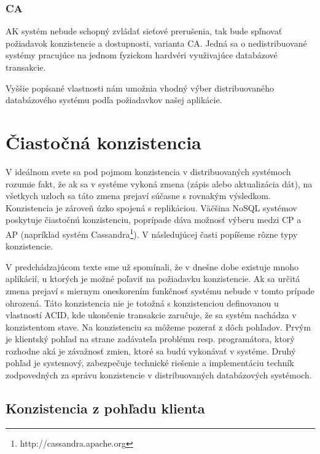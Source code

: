 \documentclass[11pt,twoside,a4paper]{book}
\begin{document}
\subsubsection*{CA}
AK systém nebude schopný zvládať sieťové prerušenia, tak bude spľnovať požiadavok konzistencie a dostupnosti, varianta CA. Jedná sa o nedistribuované systémy pracujúce na jednom fyzickom hardvéri využivajúce databázové transakcie.

Vyššie popísané vlastnosti nám umožnia vhodný výber distribuovaného databázového systému podľa požiadavkov našej aplikácie.

%




\section{Čiastočná konzistencia}
V ideálnom svete sa pod pojmom konzistencia v distribuovaných systémoch rozumie fakt, že ak sa v systéme vykoná zmena (zápis alebo aktualizácia dát), na všetkych uzloch sa táto zmena prejaví súčasne s rovnakým výsledkom. Konzistencia je zároveň úzko spojená s replikáciou. Väčšina NoSQL systémov poskytuje čiastočnú konzistenciu, poprípade dáva možnosť výberu medzi CP a AP (napríklad systém Cassandra\footnote{http://cassandra.apache.org}). V následujúcej časti popíšeme rôzne typy konzistencie.

V predchádzajúcom texte sme už spomínali, že v dnešne dobe existuje mnoho aplikácií, u ktorých je možné poľaviť na požiadavku konzistencie. Ak sa určitá zmena prejaví s miernym oneskorením funkčnosť systému nebude v tomto prípade ohrozená. Táto konzistencia nie je totožná s konzistenciou definovanou u vlastností ACID, kde ukončenie transakcie zaručuje, že sa systém nachádza v konzistentom stave. Na konzistenciu sa môžeme pozerať z dôch pohľadov. Prvým je klientský pohľad na strane zadávateľa problému resp. programátora, ktorý rozhodne aká je závažnosť zmien, ktoré sa budú vykonávať v systéme. Druhý pohľad je systemový, zabezpečuje technické riešenie a implementáciu techník zodpovedných za správu konzistencie v distribuovaných databázových systémoch.


\subsection{Konzistencia z pohľadu klienta}
\end{document}
